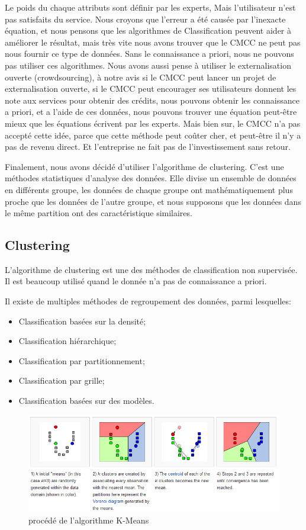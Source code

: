 Le poids du chaque attributs sont définir par les experts, Mais l'utilisateur n'est pas satisfaits du service. Nous croyons que l'erreur a été causée par l'inexacte équation, et nous pensons que les algorithmes de Classification peuvent aider à améliorer le résultat, mais très vite nous avons trouver que le CMCC ne peut pas nous fournir ce type de données. Sans le connaissance a priori, nous ne pouvons pas utiliser ces algorithmes. Nous avons aussi pense à utiliser le externalisation ouverte (crowdsourcing), à notre avis si le CMCC peut lancer un projet de externalisation ouverte, si le CMCC peut encourager ses utilisateurs donnent les note aux services pour obtenir des crédits, nous pouvons obtenir les connaissance a priori, et a l'aide de ces données, nous pouvons trouver une équation peut-être mieux que les équations écrivent par les experts. Mais bien sur, le CMCC n'a pas accepté cette idée, parce que cette méthode peut coûter cher, et peut-être il n'y a pas de revenu direct. Et l'entreprise ne fait pas de l'investissement sans retour.

Finalement, nous avons décidé d'utiliser l'algorithme de clustering. C'est une méthodes statistiques d'analyse des données. Elle divise un ensemble de données en différents groupe, les données de chaque groupe ont mathématiquement plus proche que les données de l'autre groupe,  et nous supposons que les données dans le même partition ont des caractéristique similaires.
\subsection{Clustering}
L'algorithme de clustering est une des méthodes de classification non supervisée. Il est beaucoup utilisé quand le donnée n'a pas de connaissance a priori.

Il existe de multiples méthodes de regroupement des données, parmi lesquelles:
\begin{itemize}
\item Classification basées sur la densité;
\item Classification hiérarchique;
\item Classification par partitionnement;
\item Classification par grille;
\item Classification basées sur des modèles.
\end{itemize}

\begin{figure}[H]
\centering
\includegraphics[width=0.7\linewidth]{images/kmeans}
\caption{procédé de l'algorithme K-Means}
\label{fig:kmeans}
\end{figure}

